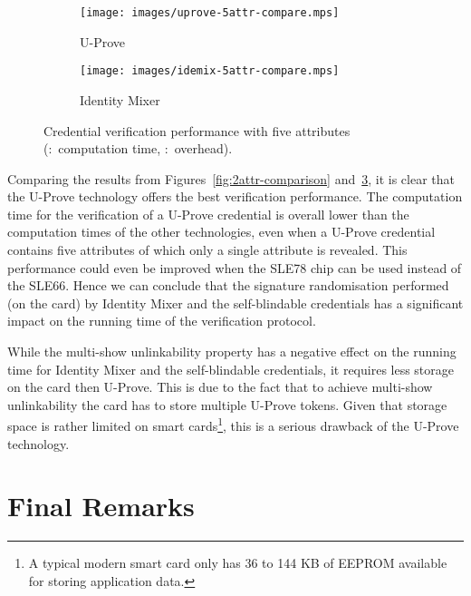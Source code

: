 \begin{figure}
  \centering
  \begin{subfigure}[b]{0.48\textwidth}
    \texttt{[image: images/uprove-5attr-compare.mps]}
    \caption{U-Prove}
    \label{fig:uprove-5attr}
  \end{subfigure}
  \begin{subfigure}[b]{0.48\textwidth}
    \texttt{[image: images/idemix-5attr-compare.mps]}
    \caption{Identity Mixer}
    \label{fig:idemix-5attr}
  \end{subfigure}

  \caption[Credential verification performance with five attributes.]{
    Credential verification performance with five attributes
    (:~computation time,
      :~overhead).}
  \label{fig:5attr-comparison}
\end{figure}

Comparing the results from Figures~\ref{fig:2attr-comparison}
and~\ref{fig:5attr-comparison}, it is clear that the U-Prove technology offers
the best verification performance. The computation time for the verification of
a U-Prove credential is overall lower than the computation times of the other
technologies, even when a U-Prove credential contains five attributes of which
only a single attribute is revealed. This performance could even be improved
when the SLE78 chip can be used instead of the SLE66. Hence we can conclude that
the signature randomisation performed (on the card) by Identity Mixer and the self-blindable
credentials has a significant impact on the running time of the verification
protocol.

While the multi-show unlinkability property has a negative effect on the running
time for Identity Mixer and the self-blindable credentials, it requires less
storage on the card then U-Prove. This is due to the fact that to achieve
multi-show unlinkability the card has to store multiple U-Prove tokens. Given
that storage space is rather limited on smart cards\footnote{A typical modern smart
card only has 36 to 144 KB of EEPROM available for storing application data.},
this is a serious drawback of the U-Prove technology.

\clearpage

\section{Final Remarks}

